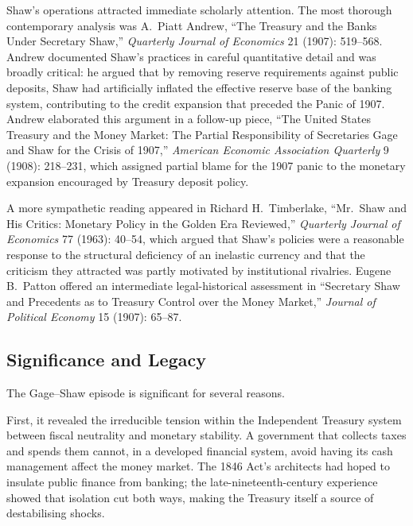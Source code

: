 \documentclass[12pt]{article}
\begin{document}
Shaw's operations attracted immediate scholarly attention.  The most
thorough contemporary analysis was A.\ Piatt Andrew, ``The Treasury and
the Banks Under Secretary Shaw,'' \emph{Quarterly Journal of Economics}
21 (1907): 519--568.  Andrew documented Shaw's practices in careful
quantitative detail and was broadly critical: he argued that by
removing reserve requirements against public deposits, Shaw had
artificially inflated the effective reserve base of the banking system,
contributing to the credit expansion that preceded the Panic of 1907.
Andrew elaborated this argument in a follow-up piece, ``The United
States Treasury and the Money Market: The Partial Responsibility of
Secretaries Gage and Shaw for the Crisis of 1907,'' \emph{American
Economic Association Quarterly} 9 (1908): 218--231, which assigned
partial blame for the 1907 panic to the monetary expansion encouraged
by Treasury deposit policy.

A more sympathetic reading appeared in Richard H.\ Timberlake, ``Mr.\
Shaw and His Critics: Monetary Policy in the Golden Era Reviewed,''
\emph{Quarterly Journal of Economics} 77 (1963): 40--54, which argued
that Shaw's policies were a reasonable response to the structural
deficiency of an inelastic currency and that the criticism they
attracted was partly motivated by institutional rivalries.  Eugene B.\
Patton offered an intermediate legal-historical assessment in
``Secretary Shaw and Precedents as to Treasury Control over the Money
Market,'' \emph{Journal of Political Economy} 15 (1907): 65--87.

\subsection{Significance and Legacy}

The Gage--Shaw episode is significant for several reasons.

First, it revealed the irreducible tension within the Independent
Treasury system between fiscal neutrality and monetary stability.
A government that collects taxes and spends them cannot, in
a developed financial system, avoid having its cash management affect
the money market.  The 1846 Act's architects had hoped to insulate
public finance from banking; the late-nineteenth-century experience
showed that isolation cut both ways, making the Treasury itself a
source of destabilising shocks.
\end{document}
